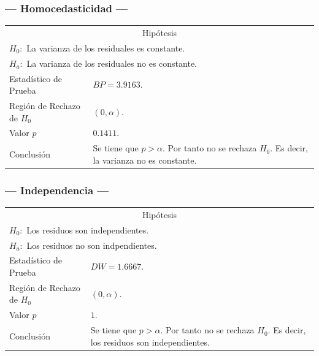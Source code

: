 \subsubsection{--- Homocedasticidad ---} %
\begin{center}
  \begin{tabular}{|l|p{8cm}|}
    \cline{1-2}
    \multicolumn{2}{|c|}{Hipótesis}\\ \cline{1-2}
    \multicolumn{2}{|l|}{\(H_0:\) La varianza de los residuales es constante.} \\ 
    \multicolumn{2}{|l|}{\(H_a:\) La varianza de los residuales no es constante.} \\ \cline{1-2}
    Estadístico de Prueba & \(BP = 3.9163\).\\ \cline{1-2} 
		Región de Rechazo de \(H_0\) & \((0, \alpha )\).\\ \cline{1-2} 
    Valor \(p\) & \(0.1411\).\\ \cline{1-2} 
    Conclusión & Se tiene que \(p> \alpha\). \newline 
		Por tanto no se rechaza \(H_0\). \newline 
		Es decir, la varianza no es constante. \\ \cline{1-2} 
  \end{tabular}
\end{center}

\subsubsection{--- Independencia ---} %
\begin{center}
  \begin{tabular}{|l|p{8cm}|}
    \cline{1-2}
    \multicolumn{2}{|c|}{Hipótesis}\\ \cline{1-2}
    \multicolumn{2}{|l|}{\(H_0:\) Los residuos son independientes.} \\ 
    \multicolumn{2}{|l|}{\(H_a:\) Los residuos no son indpendientes.} \\ \cline{1-2}
    Estadístico de Prueba & \(DW = 1.6667\).\\ \cline{1-2} 
		Región de Rechazo de \(H_0\) & \((0, \alpha )\).\\ \cline{1-2} 
    Valor \(p\) & \(1\).\\ \cline{1-2} 
    Conclusión & Se tiene que \(p> \alpha\). \newline 
		Por tanto no se rechaza \(H_0\). \newline 
		Es decir, los residuos son independientes.\\ \cline{1-2} 
  \end{tabular}
\end{center}

